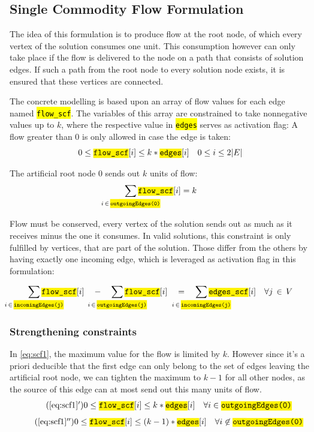\documentclass[,%
			paper=a4,%
			DIV14,
			liststotoc,
			bibtotoc,
			draft=false,%
			numbers=noendperiod
			]{scrartcl}
\newcommand{\ilc}[1]{\hl{\texttt{#1}}} %
\newcommand{\edge}{i}
\newcommand{\forallEdges}{\ensuremath{0 \leq \edge \leq 2|E|}}
\begin{document}
\subsection{Single Commodity Flow Formulation}

The idea of this formulation is to produce flow at the root node, of which every vertex of the solution consumes one unit.
This consumption however can only take place if the flow is delivered to the node on a path that consists of solution edges.
If such a path from the root node to every solution node exists, it is ensured that these vertices are connected.

The concrete modelling is based upon an array of flow values for each edge named \ilc{flow\_scf}.
The variables of this array are constrained to take nonnegative values up to $k$, where the respective value in \ilc{edges} serves as activation flag: A flow greater than 0 is only allowed in case the edge is taken:
\begin{equation}\label{eq:scf1}
	0 \leq \ilc{flow\_scf}[\edge] \leq k * \ilc{edges}[\edge] \quad \forallEdges 
\end{equation}

The artificial root node $0$ sends out $k$ units of flow:\nolinebreak
\begin{equation}
	\sum_{\mathclap{i\,\in\,\ilc{outgoingEdges(0)}}} \ilc{flow\_scf}[i] = k
\end{equation}

Flow must be conserved, every vertex of the solution sends out as much as it receives minus the one it consumes. In valid solutions, this constraint is only fulfilled by vertices, that are part of the solution. Those differ from the others by having exactly one incoming edge, which is leveraged as activation flag in this formulation:

\begin{equation}
	\sum_{\mathclap{i\,\in\,\ilc{incomingEdges(j)}}} \ilc{flow\_scf}[i] \quad - \quad
	\sum_{\mathclap{i\,\in\,\ilc{outgoingEdges(j)}}} \ilc{flow\_scf}[i] \quad = \quad 
	\sum_{\mathclap{i\,\in\,\ilc{incomingEdges(j)}}} \ilc{edges\_scf}[i] 
	\quad \forall j\,\in\,V
\end{equation}


\subsubsection{Strengthening constraints}

In \eqref{eq:scf1}, the maximum value for the flow is limited by $k$. However since it's a priori deducible that the first edge can only belong to the set of edges leaving the artificial root node, we can tighten the maximum to $k-1$ for all other nodes, as the source of this edge can at most send out this many units of flow.
\begin{equation}\tag{\ref{eq:scf1}$^\prime$}
	0 \leq \ilc{flow\_scf}[i] \leq k * \ilc{edges}[i] \quad \forall i \in \ilc{outgoingEdges(0)} 
\end{equation}
\begin{equation}\tag{\ref{eq:scf1}$^{\prime\prime}$}
	0 \leq \ilc{flow\_scf}[i] \leq (k-1) * \ilc{edges}[i] \quad \forall i \not\in \ilc{outgoingEdges(0)}
\end{equation}
\end{document}
